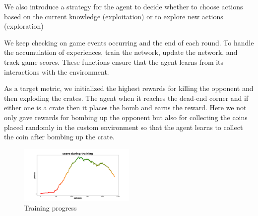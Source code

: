 We also introduce a strategy for the agent to decide whether to choose actions based on the current knowledge (exploitation) or to explore new actions (exploration)

We keep checking on game events occurring and the end of each round. To handle the accumulation of experiences, train the network, update the network, and track game scores. These functions ensure that the agent learns from its interactions with the environment.

As a target metric, we initialized the highest rewards for killing the opponent and then exploding the crates. The agent when it reaches the dead-end corner and if either one is a crate then it places the bomb and earns the reward. Here we not only gave rewards for bombing up the opponent but also for collecting the coins placed randomly in the custom environment so that the agent learns to collect the coin after bombing up the crate. 

\begin{figure}
    \centering
    \includegraphics[width=0.5\textwidth]{src/training_progress.png}
    \caption{Training progress}
    \label{fig:enter-label}
\end{figure}
